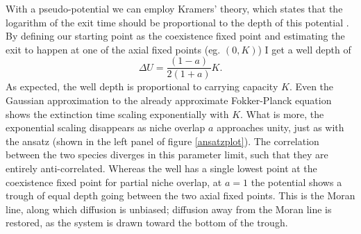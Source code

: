With a pseudo-potential we can employ Kramers' theory, which states that the logarithm of the exit time should be proportional to the depth of this potential \cite{Hanggi1990}. 
By defining our starting point as the coexistence fixed point and estimating the exit to happen at one of the axial fixed points (eg. $(0,K)$) I get a well depth of
\begin{equation}
\Delta U = \frac{(1-a)}{2(1+a)}K. 
\end{equation}
As expected, the well depth is proportional to carrying capacity $K$. 
Even the Gaussian approximation to the already approximate Fokker-Planck equation shows the extinction time scaling exponentially with $K$. 
What is more, the exponential scaling disappears as niche overlap $a$ approaches unity, just as with the ansatz (shown in the left panel of figure \ref{ansatzplot}). 
The correlation between the two species diverges in this parameter limit, such that they are entirely anti-correlated. 
Whereas the well has a single lowest point at the coexistence fixed point for partial niche overlap, at $a=1$ the potential shows a trough of equal depth going between the two axial fixed points. 
This is the Moran line, along which diffusion is unbiased; diffusion away from the Moran line is restored, as the system is drawn toward the bottom of the trough. 



